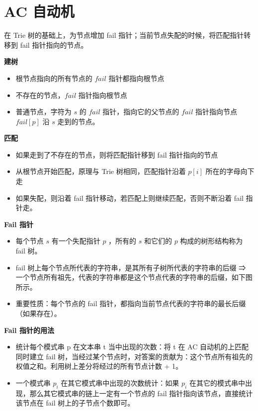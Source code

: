 \section{AC 自动机}

\par 在 Trie 树的基础上，为节点增加 fail 指针；当前节点失配的时候，将匹配指针转移到 fail 指针指向的节点。
\vspace{0.5em}

\par\textbf{建树}
\begin{itemize}
    \item 根节点指向的所有节点的 $fail$ 指针都指向根节点
    \item 不存在的节点，$fail$ 指针指向根节点
    \item 普通节点，字符为 $s$ 的 $fail$ 指针，指向它的父节点的 $fail$ 指针指向节点 $fail[p]$ 沿 $s$ 走到的节点。
\end{itemize}

\par\textbf{匹配}
\begin{itemize}
    \item 如果走到了不存在的节点，则将匹配指针移到 fail 指针指向的节点
    \item 从根节点开始匹配，原理与 Trie 树相同，匹配指针沿着 $p[i]$ 所在的字母向下走
    \item 如果失配，则沿着 fail 指针移动，若匹配上则继续匹配，否则不断沿着 fail 指针走。
\end{itemize}

\par\textbf{Fail 指针}
\begin{itemize}
    \item 每个节点 $s$ 有一个失配指针 $p$ ，所有的 $s$ 和它们的 $p$ 构成的树形结构称为 fail 树。
    \item fail 树上每个节点所代表的字符串，是其所有子树所代表的字符串的后缀 ⇒ 一个节点所有祖先，代表的字符串都是这个节点代表的字符串的后缀，如下图所示。
    \item 重要性质：每个节点的 fail 指针，都指向当前节点代表的字符串的最长后缀（如果存在）。
\end{itemize}

\par\textbf{Fail 指针的用法}
\begin{itemize}
    \item 统计每个模式串 p 在文本串 t 当中出现的次数：将 t 在 AC 自动机的上匹配同时建立 fail 树，当经过某个节点时，对答案的贡献为：这个节点所有祖先的权值之和。利用树上差分将经过的所有节点计数 + 1。
    \item 一个模式串 $p_i$ 在其它模式串中出现的次数统计：如果 $p_i$ 在其它的模式串中出现，那么其它模式串的链上一定有一个节点的 fail 指针指向该节点，直接统计该节点在 fail 树上的子节点个数即可。
\end{itemize}

